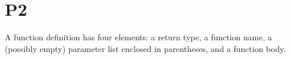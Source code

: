 \documentclass{article}
\begin{document}
\section{P2}
A function definition has four elements: a return type, a function name, a (possibly empty) parameter list enclosed in parentheses, and a function body.
\end{document}
